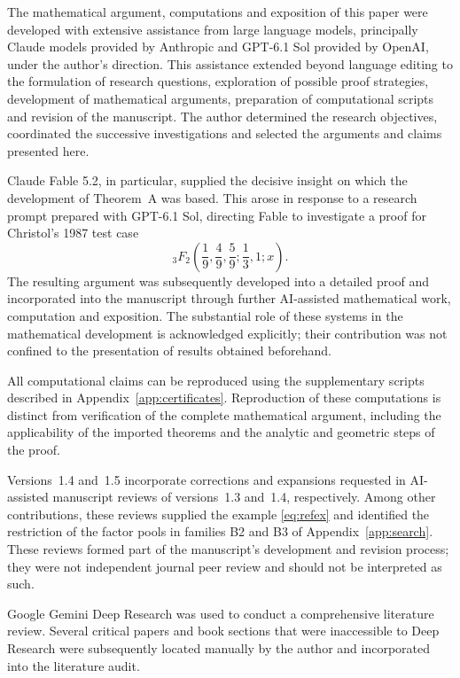 \documentclass[11pt]{amsart}
\theoremstyle{definition}
\theoremstyle{remark}
\numberwithin{equation}{section}
\begin{document}
The mathematical argument, computations and exposition of this paper
were developed with extensive assistance from large language models,
principally Claude models provided by Anthropic and GPT-6.1 Sol
provided by OpenAI, under the author's direction. This assistance
extended beyond language editing to the formulation of research
questions, exploration of possible proof strategies, development of
mathematical arguments, preparation of computational scripts and
revision of the manuscript. The author determined the research
objectives, coordinated the successive investigations and selected
the arguments and claims presented here.

Claude Fable 5.2, in particular, supplied the decisive insight on which
the development of Theorem~A was based. This arose in response to a
research prompt prepared with GPT-6.1 Sol, directing Fable to investigate
a proof for Christol's 1987 test case
\[
{}_3F_2\!\left(\frac19,\frac49,\frac59;\frac13,1;x\right).
\]
The resulting argument was subsequently developed into a detailed
proof and incorporated into the manuscript through further
AI-assisted mathematical work, computation and exposition. The
substantial role of these systems in the mathematical development
is acknowledged explicitly; their contribution was not confined to
the presentation of results obtained beforehand.

All computational claims can be reproduced using the supplementary
scripts described in Appendix~\ref{app:certificates}. Reproduction of
these computations is distinct from verification of the complete
mathematical argument, including the applicability of the imported
theorems and the analytic and geometric steps of the proof.

Versions~1.4 and~1.5 incorporate corrections and expansions requested
in AI-assisted manuscript reviews of versions~1.3 and~1.4,
respectively. Among other contributions, these reviews supplied the
example \eqref{eq:refex} and identified the restriction of the factor
pools in families B2 and B3 of Appendix~\ref{app:search}. These reviews
formed part of the manuscript's development and revision process;
they were not independent journal peer review and should not be
interpreted as such. 

Google Gemini Deep Research was used to conduct a comprehensive literature review. Several critical papers and book sections that were inaccessible to Deep Research were subsequently located manually by the author and incorporated into the literature audit.
\end{document}
